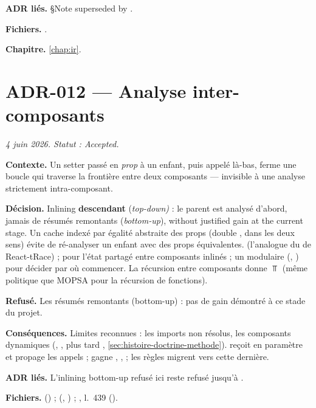 \textbf{ADR liés.} §Note superseded by .

\textbf{Fichiers.} .

\textbf{Chapitre.} \cref{chap:ir}.

\section{ADR-012 --- Analyse inter-composants}
\label{adr:12}
\noindent\textit{4 juin 2026. Statut : Accepted.}

\textbf{Contexte.} Un setter passé en \emph{prop} à un enfant, puis appelé
là-bas, ferme une boucle qui traverse la frontière entre deux composants ---
invisible à une analyse strictement intra-composant.

\textbf{Décision.} Inlining \textbf{descendant} (\emph{top-down)} : le parent
est analysé d'abord, jamais de résumés remontants (\emph{bottom-up}), \og
without justified gain at the current stage\fg{}. Un cache indexé par égalité
abstraite des props (double , dans les deux sens) évite de
ré-analyser un enfant avec des props équivalentes. 
(l'analogue du  de React-tRace) ;  pour
l'état partagé entre composants inlinés ; un  modulaire
(, ) pour décider par où commencer. La
récursion entre composants donne $\Top$ (même politique que MOPSA pour la
récursion de fonctions).

\textbf{Refusé.} Les résumés remontants (bottom-up) : pas de gain démontré à
ce stade du projet.

\textbf{Conséquences.} Limites reconnues : les imports non résolus, les
composants dynamiques (, , plus tard
, \cref{sec:histoire-doctrine-methode}). 
reçoit  en paramètre et propage les appels
 ;  gagne ,
,  ; les règles migrent vers
cette dernière.

\textbf{ADR liés.} L'inlining bottom-up refusé ici reste refusé jusqu'à
\code{\snapshotCommit}.

\begin{sloppypar}
\textbf{Fichiers.}  () ;
 (, ) ;
, l.~439 ().
\end{sloppypar}

